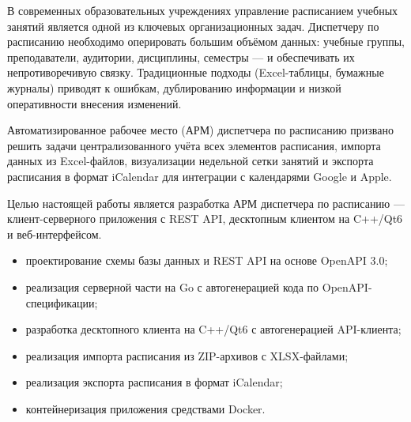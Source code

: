 \Introduction

В современных образовательных учреждениях управление расписанием учебных занятий является одной из ключевых организационных задач. Диспетчеру по расписанию необходимо оперировать большим объёмом данных: учебные группы, преподаватели, аудитории, дисциплины, семестры — и обеспечивать их непротиворечивую связку. Традиционные подходы (Excel-таблицы, бумажные журналы) приводят к ошибкам, дублированию информации и низкой оперативности внесения изменений.

Автоматизированное рабочее место (АРМ) диспетчера по расписанию призвано решить задачи централизованного учёта всех элементов расписания, импорта данных из Excel-файлов, визуализации недельной сетки занятий и экспорта расписания в формат iCalendar для интеграции с календарями Google и Apple.

Целью настоящей работы является разработка АРМ диспетчера по расписанию — клиент-серверного приложения с REST API, десктопным клиентом на C++/Qt6 и веб-интерфейсом.

\begin{itemize}
	\item проектирование схемы базы данных и REST API на основе OpenAPI 3.0;
	\item реализация серверной части на Go с автогенерацией кода по OpenAPI-спецификации;
	\item разработка десктопного клиента на C++/Qt6 с автогенерацией API-клиента;
	\item реализация импорта расписания из ZIP-архивов с XLSX-файлами;
	\item реализация экспорта расписания в формат iCalendar;
	\item контейнеризация приложения средствами Docker.
\end{itemize}


